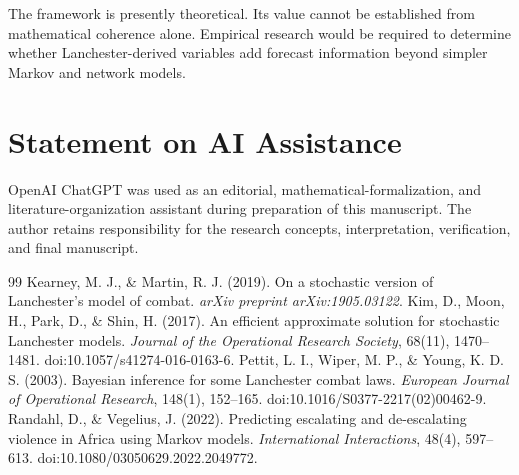 \documentclass[11pt,letterpaper]{article}
\begin{document}
The framework is presently theoretical. Its value cannot be established from mathematical coherence alone. Empirical research would be required to determine whether Lanchester-derived variables add forecast information beyond simpler Markov and network models.

\section*{Statement on AI Assistance}
OpenAI ChatGPT was used as an editorial, mathematical-formalization, and literature-organization assistant during preparation of this manuscript. The author retains responsibility for the research concepts, interpretation, verification, and final manuscript.

\begin{thebibliography}{99}
 Kearney, M. J., \& Martin, R. J. (2019). On a stochastic version of Lanchester's model of combat. \emph{arXiv preprint arXiv:1905.03122}.
 Kim, D., Moon, H., Park, D., \& Shin, H. (2017). An efficient approximate solution for stochastic Lanchester models. \emph{Journal of the Operational Research Society}, 68(11), 1470--1481. doi:10.1057/s41274-016-0163-6.
 Pettit, L. I., Wiper, M. P., \& Young, K. D. S. (2003). Bayesian inference for some Lanchester combat laws. \emph{European Journal of Operational Research}, 148(1), 152--165. doi:10.1016/S0377-2217(02)00462-9.
 Randahl, D., \& Vegelius, J. (2022). Predicting escalating and de-escalating violence in Africa using Markov models. \emph{International Interactions}, 48(4), 597--613. doi:10.1080/03050629.2022.2049772.
\end{thebibliography}
\end{document}
